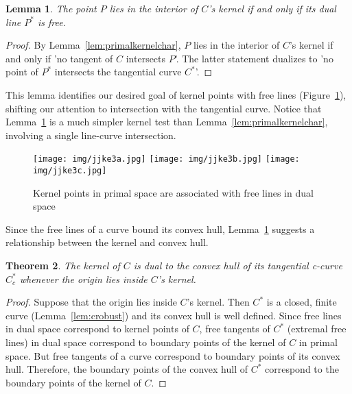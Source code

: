 \documentclass{sig-alternate}
\newtheorem{theorem}{Theorem}
\newtheorem{lemma}[theorem]{Lemma}
\begin{document}
\begin{lemma}
\label{lem:dualkernelchar}
The point $P$ lies in the interior of $C$'s kernel if and only if 
its dual line $P^*$ is free.
\end{lemma}
\begin{proof}
By Lemma~\ref{lem:primalkernelchar},
$P$ lies in the interior of $C$'s kernel if and only if 
'no tangent of $C$ intersects $P$'.
The latter statement dualizes to 'no point of $P^*$ intersects the tangential curve $C^*$'.
\end{proof}

This lemma identifies our desired goal of kernel points with free lines (Figure~\ref{fig:freeline}),
shifting our attention to intersection with the tangential curve.
Notice that Lemma~\ref{lem:dualkernelchar} is a much simpler kernel test than 
Lemma~\ref{lem:primalkernelchar},
involving a single line-curve intersection.

\begin{figure}[h]
\begin{center}
\texttt{[image: img/jjke3a.jpg]}
\texttt{[image: img/jjke3b.jpg]}
\texttt{[image: img/jjke3c.jpg]}
\end{center}
\caption{Kernel points in primal space are associated with free lines in dual space}
\label{fig:freeline}
\end{figure}

Since the free lines of a curve bound its convex hull,
Lemma~\ref{lem:dualkernelchar} suggests a relationship between the kernel 
and convex hull.

\begin{theorem}
\label{thm:kerneldual}
The kernel of $C$ is dual to the convex hull of its tangential c-curve $C^*_c$
whenever the origin lies inside $C$'s kernel.
\end{theorem}
\begin{proof}
Suppose that the origin lies inside $C$'s kernel.
Then $C^*$ is a closed, finite curve (Lemma~\ref{lem:crobust}) 
and its convex hull is well defined.
Since free lines in dual space correspond to kernel points of $C$,
free tangents of $C^*$ (extremal free lines)
in dual space correspond to boundary points of the kernel of $C$ in primal space.
But free tangents of a curve correspond to boundary points of its convex hull.
Therefore, the boundary points of the convex hull of $C^*$ correspond to the 
boundary points of the kernel of $C$.
\end{proof}
\end{document}
